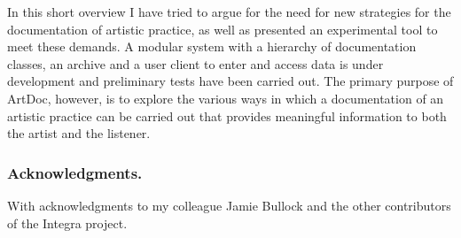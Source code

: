 \documentclass[,a4paper]{llncs}
\begin{document}
In this short overview I have tried to argue for the need for new strategies for the documentation of artistic practice, as well as presented an experimental tool to meet these demands. A modular system with a hierarchy of documentation classes, an archive and a user client to enter and access data is under development and preliminary tests have been carried out. The primary purpose of ArtDoc, however, is to explore the various ways in which a documentation of an artistic practice can be carried out that provides meaningful information to both the artist and the listener.


\subsubsection*{Acknowledgments.} With acknowledgments to my colleague Jamie Bullock and the other contributors of the Integra project.
\end{document}

